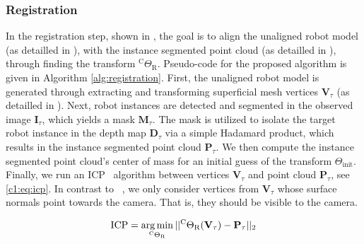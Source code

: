 \subsubsection{Registration}
\label{c1:sec:registration}
In the registration step, shown in , the goal is to align the unaligned robot model (as detailled in ), with the instance segmented point cloud (as detailled in ), through finding the transform $^\text{C}\Theta_\text{R}$. Pseudo-code for the proposed algorithm is given in Algorithm \ref{alg:registration}.
First, the unaligned robot model is generated through extracting and transforming superficial mesh vertices $\mathbf{V}_\tau$ (as detailled in ).
Next, robot instances are detected and segmented in the observed image $\mathbf{I}_\tau$, which yields a mask $\mathbf{M}_\tau$.
The mask is utilized to isolate the target robot instance in the depth map $\mathbf{D}_\tau$ via a simple Hadamard product, which results in the instance segmented point cloud $\mathbf{P}_\tau$.
We then compute the instance segmented point cloud's center of mass for an initial guess of the transform $\Theta_\text{init}$. Finally, we run an ICP~\citep{simple_icp} algorithm between vertices $\mathbf{V}_\tau$ and point cloud $\mathbf{P}_\tau$, see \eqref{c1:eq:icp}. In contrast to ~\citep{simple_icp}, we only consider vertices from $\mathbf{V}_\tau$ whose surface normals point towards the camera. That is, they should be visible to the camera.

\begin{equation}
    \label{c1:eq:icp}
    \text{ICP} = \argmin_{^\text{C}\Theta_\text{R}} || ^\text{C}\Theta_\text{R}(\mathbf{V}_\tau) - \mathbf{P}_\tau||_2
\end{equation}

